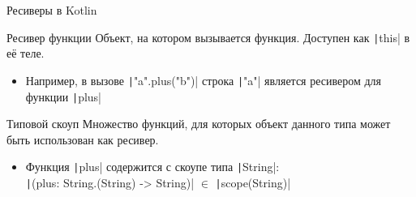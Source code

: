 \documentclass[handout,aspectratio=169,usenames,dvipsnames]{beamer}
\begin{document}
    \begin{frame}[fragile]{Ресиверы в Kotlin}
        \begin{block}{Ресивер функции}
            Объект, на котором вызывается функция.
            Доступен как \texttt|this| в её теле.
            \begin{itemize}
                \item Например, в вызове \texttt|"a".plus("b")| строка \texttt|"a"| является ресивером для функции \texttt|plus|
            \end{itemize}
        \end{block}
        \pause
        \begin{block}{Типовой скоуп}
            Множество функций, для которых объект данного типа может быть использован как ресивер.
            \begin{itemize}
                \item Функция \texttt|plus| содержится с скоупе типа \texttt|String|: \\
                \texttt|(plus: String.(String) -> String)| $\in$ \texttt|scope(String)|
            \end{itemize}
        \end{block}
    \end{frame}
\end{document}

